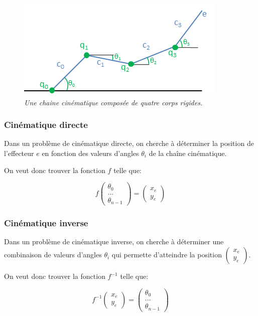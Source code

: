 \documentclass{article}
\begin{document}
\begin{figure}[htb]
  \centering
    \includegraphics[]{chainangles}
  \caption{
          \textit{Une chaine cin\'ematique compos\'ee de quatre corps rigides.}}
		   \label{chainangle}
\end{figure}

\subsubsection*{Cin\'ematique directe}
Dans un probl\`eme de cin\'ematique directe, on cherche \`a d\'eterminer la position de l'effecteur $e$ en fonction
des valeurs d'angles $\theta_i$ de la cha\^ine cin\'ematique.

On veut donc trouver la fonction $f$ telle que:

\begin{displaymath}  
f\begin{pmatrix} \theta_0 \\ ... \\ \theta_{n-1} \end{pmatrix} = \begin{pmatrix}
x_e \\
y_e
\end{pmatrix}
\end{displaymath}
 
 \subsubsection*{Cin\'ematique inverse}
Dans un probl\`eme de cin\'ematique inverse, on cherche \`a d\'eterminer une combinaison de valeurs d'angles $\theta_i$ qui permette
d'atteindre la position $\begin{pmatrix} x_e \\ y_e \end{pmatrix}$.

On veut donc trouver la fonction $f^{-1}$ telle que:

\begin{displaymath}  
f^{-1} \begin{pmatrix} x_e \\ y_e \end{pmatrix} =  \begin{pmatrix} \theta_0 \\ ... \\ \theta_{n-1} \end{pmatrix}
 \end{displaymath}
 
\end{document}
